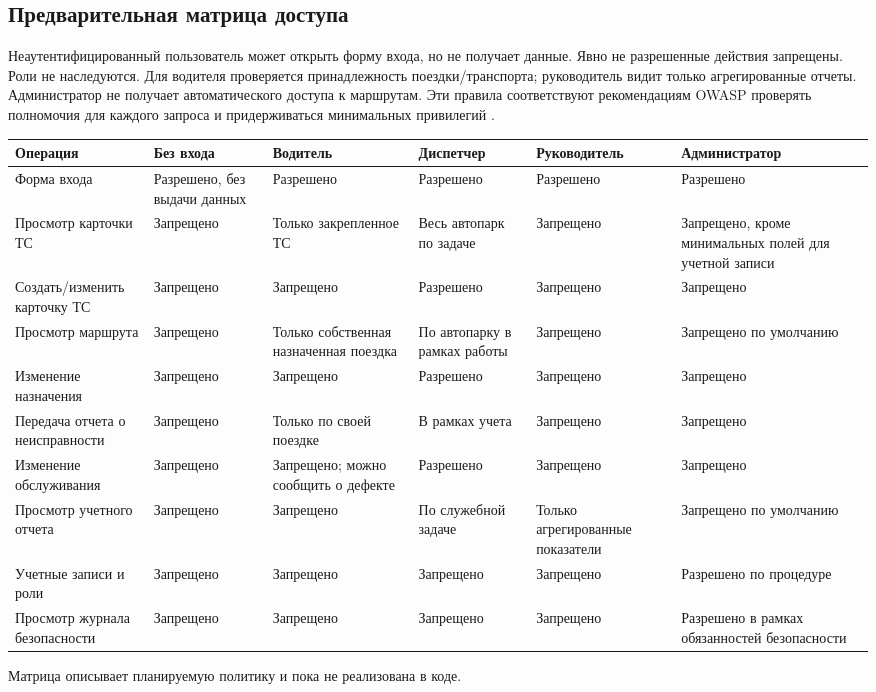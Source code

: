 \documentclass[12pt,a4paper]{article}
\begin{document}
\begin{landscape}
\section{Предварительная матрица доступа}
Неаутентифицированный пользователь может открыть форму входа, но не получает данные. Явно не разрешенные действия запрещены. Роли не наследуются. Для водителя проверяется принадлежность поездки/транспорта; руководитель видит только агрегированные отчеты. Администратор не получает автоматического доступа к маршрутам. Эти правила соответствуют рекомендациям OWASP проверять полномочия для каждого запроса и придерживаться минимальных привилегий \cite{owasp-auth}.

\small
\begin{tabularx}{\linewidth}{p{6cm}YYYYY}
\toprule Операция & Без входа & Водитель & Диспетчер & Руководитель & Администратор \\
\midrule
Форма входа & Разрешено, без выдачи данных & Разрешено & Разрешено & Разрешено & Разрешено \\
Просмотр карточки ТС & Запрещено & Только закрепленное ТС & Весь автопарк по задаче & Запрещено & Запрещено, кроме минимальных полей для учетной записи \\
Создать/изменить карточку ТС & Запрещено & Запрещено & Разрешено & Запрещено & Запрещено \\
Просмотр маршрута & Запрещено & Только собственная назначенная поездка & По автопарку в рамках работы & Запрещено & Запрещено по умолчанию \\
Изменение назначения & Запрещено & Запрещено & Разрешено & Запрещено & Запрещено \\
Передача отчета о неисправности & Запрещено & Только по своей поездке & В рамках учета & Запрещено & Запрещено \\
Изменение обслуживания & Запрещено & Запрещено; можно сообщить о дефекте & Разрешено & Запрещено & Запрещено \\
Просмотр учетного отчета & Запрещено & Запрещено & По служебной задаче & Только агрегированные показатели & Запрещено по умолчанию \\
Учетные записи и роли & Запрещено & Запрещено & Запрещено & Запрещено & Разрешено по процедуре \\
Просмотр журнала безопасности & Запрещено & Запрещено & Запрещено & Запрещено & Разрешено в рамках обязанностей безопасности \\
\bottomrule
\end{tabularx}
Матрица описывает планируемую политику и пока не реализована в коде.
\end{landscape}
\end{document}
